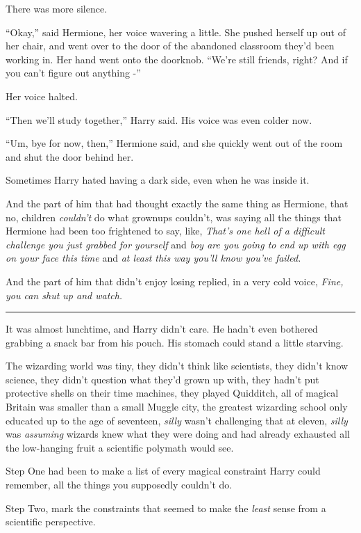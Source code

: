 There was more silence.

``Okay,'' said Hermione, her voice wavering a little. She pushed herself
up out of her chair, and went over to the door of the abandoned
classroom they'd been working in. Her hand went onto the doorknob.
``We're still friends, right? And if you can't figure out anything -''

Her voice halted.

``Then we'll study together,'' Harry said. His voice was even colder
now.

``Um, bye for now, then,'' Hermione said, and she quickly went out of
the room and shut the door behind her.

Sometimes Harry hated having a dark side, even when he was inside it.

And the part of him that had thought exactly the same thing as Hermione,
that no, children \emph{couldn't} do what grownups couldn't, was saying
all the things that Hermione had been too frightened to say, like,
\emph{That's one hell of a difficult challenge you just grabbed for
yourself} and \emph{boy are you going to end up with egg on your face
this time} and \emph{at least this way you'll know you've failed.}

And the part of him that didn't enjoy losing replied, in a very cold
voice, \emph{Fine, you can shut up and watch.}

\begin{center}\rule{3in}{0.4pt}\end{center}

It was almost lunchtime, and Harry didn't care. He hadn't even bothered
grabbing a snack bar from his pouch. His stomach could stand a little
starving.

The wizarding world was tiny, they didn't think like scientists, they
didn't know science, they didn't question what they'd grown up with,
they hadn't put protective shells on their time machines, they played
Quidditch, all of magical Britain was smaller than a small Muggle city,
the greatest wizarding school only educated up to the age of seventeen,
\emph{silly} wasn't challenging that at eleven, \emph{silly} was
\emph{assuming} wizards knew what they were doing and had already
exhausted all the low-hanging fruit a scientific polymath would see.

Step One had been to make a list of every magical constraint Harry could
remember, all the things you supposedly couldn't do.

Step Two, mark the constraints that seemed to make the \emph{least}
sense from a scientific perspective.

